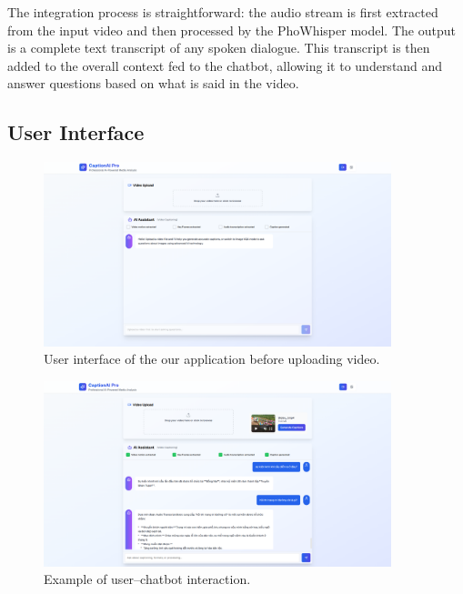 The integration process is straightforward: the audio stream is first extracted from the input video and then processed by the PhoWhisper model. The output is a complete text transcript of any spoken dialogue. This transcript is then added to the overall context fed to the chatbot, allowing it to understand and answer questions based on what is said in the video.


\subsection{User Interface}



\begin{figure}[H]
\centering
\includegraphics[width=0.9\textwidth]{image/UI/home.png}
\caption{User interface of the our application before uploading video.}
\label{fig:home_ui}
\end{figure}

\begin{figure}[H]
\centering
\includegraphics[width=0.9\textwidth]{image/UI/example.png}
\caption{Example of user--chatbot interaction.}
\label{fig:example_ui}
\end{figure}

